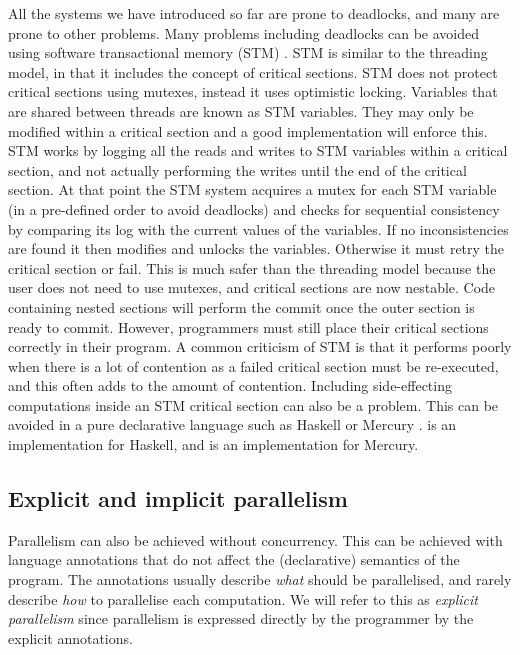 All the systems we have introduced so far are prone to deadlocks,
and many are prone to other problems.
Many problems including deadlocks can be avoided using software
transactional memory (STM) \citep{stm}.
STM is similar to the threading model,
in that it includes the concept of critical sections.
STM does not protect critical sections using mutexes,
instead it uses optimistic locking.
Variables that are shared between threads are known as STM variables.
They may only be modified within a critical section and a good implementation
will enforce this.
STM works by logging all the reads and writes to STM variables within a
critical section,
and not actually performing the writes until the end of the critical
section.
At that point the STM system acquires a mutex for each STM variable
(in a pre-defined order to avoid deadlocks)
and checks for sequential consistency by comparing its log with the current
values of the variables.
If no inconsistencies are found
it then modifies and unlocks the variables.
Otherwise it must retry the critical section or fail.
This is much safer than the threading model because
the user does not need to use mutexes,
and critical sections are now nestable.
Code containing nested sections will perform the commit once 
the outer section is ready to commit.
However, programmers must still place their critical sections correctly in
their program.
A common criticism of STM is that it performs poorly when there is a lot of
contention as a failed critical section must be re-executed,
and this often adds to the amount of contention.
Including side-effecting computations inside an STM critical section can also
be a problem.
This can be avoided in a pure declarative language such as
Haskell \citep{haskell98} or Mercury \citep{mercury_jlp}.
\citet*{harris:2005:haskell-stm} is an implementation for Haskell,
and \citet*{mika:mercury-stm} is an implementation for Mercury.

\subsection{Explicit and implicit parallelism}
\label{sec:intro_par}

Parallelism can also be achieved without concurrency.
This can be achieved with language annotations that do not affect the
(declarative) semantics of the program.
The annotations usually describe \emph{what} should be parallelised,
and rarely describe \emph{how} to parallelise each computation.
We will refer to this as \emph{explicit parallelism}
since parallelism is expressed directly by the programmer by the explicit
annotations.

